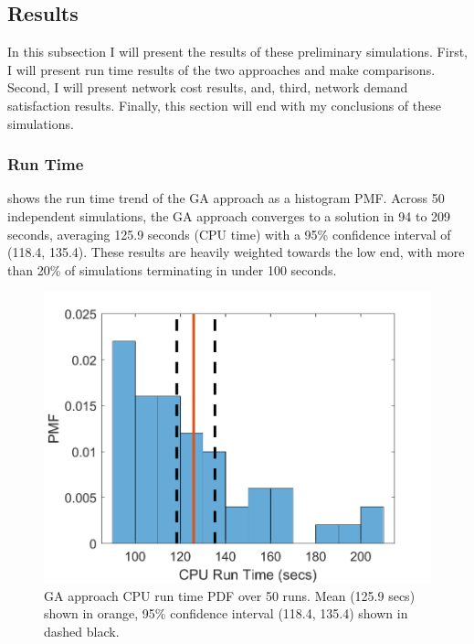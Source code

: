 \documentclass[12pt,dvipsnames]{report}
\begin{document}
\subsection{Results} \label{subsec:prelim_results}

In this subsection I will present the results of these preliminary simulations.  First, I will present run time results of the two approaches and make comparisons.  Second, I will present network cost results, and, third, network demand satisfaction results.  Finally, this section will end with my conclusions of these simulations.

\subsubsection{Run Time}

 shows the run time trend of the GA approach as a histogram PMF.  Across 50 independent simulations, the GA approach converges to a solution in 94 to 209 seconds, averaging 125.9 seconds (CPU time) with a 95\% confidence interval of (118.4, 135.4).  These results are heavily weighted towards the low end, with more than 20\% of simulations terminating in under 100 seconds.

\begin{figure}[ht]
	\centering
	\includegraphics[height=0.45\textheight]{Figures/Prelim_GARuntime50}
	\caption[Preliminary simulations GA CPU run time PDF]{GA approach CPU run time PDF over 50 runs.  Mean (125.9 secs) shown in orange, 95\% confidence interval (118.4, 135.4) shown in dashed black.}
	\label{fig:Prelim_GARunTime}
\end{figure}
\end{document}
